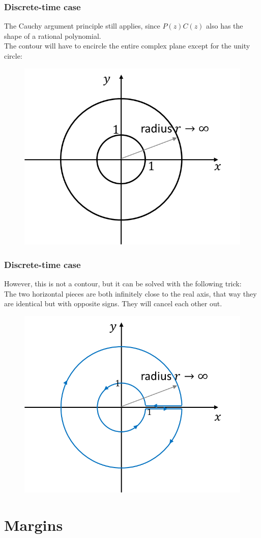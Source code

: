 \begin{frame}
	\frametitle{Discrete-time case}
	The Cauchy argument principle still applies, since $P(z)C(z)$ also has the shape of a rational polynomial.\\
	The contour will have to encircle the entire complex plane except for the unity circle:
	\vspace{-2ex}
	\begin{figure}
		\includegraphics[width=0.55\linewidth]{discrete}
	\end{figure}
\end{frame}

\begin{frame}
	\frametitle{Discrete-time case}
	However, this is not a contour, but it can be solved with the following trick:\\
	The two horizontal pieces are both infinitely close to the real axis, that way they are identical but with opposite signs. They will cancel each other out.
	\vspace{-2ex}
	\begin{figure}
		\includegraphics[width=0.5\linewidth]{discrete2}
	\end{figure}
\end{frame}

\section{Margins}

